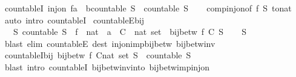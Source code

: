 \begin{isabellebody}
\endisatagproof
{\isafoldproof}%
%
\isadelimproof
\isanewline
%
\endisadelimproof
\isanewline
{}\isamarkupfalse%
\ countableI{\isacharprime}{\isacharcolon}\ {\isachardoublequoteopen}inj{\isacharunderscore}on\ {\isacharparenleft}f{\isacharcolon}{\isacharcolon}{\isacharprime}a\ {\isasymRightarrow}\ {\isacharprime}b{\isacharcolon}{\isacharcolon}countable{\isacharparenright}\ S\ {\isasymLongrightarrow}\ countable\ S{\isachardoublequoteclose}\isanewline
%
\isadelimproof
\ \ %
\endisadelimproof
%
\isatagproof
{}\isamarkupfalse%
\ comp{\isacharunderscore}inj{\isacharunderscore}on{\isacharbrackleft}of\ f\ S\ to{\isacharunderscore}nat{\isacharbrackright}\ \isamarkupfalse%
\ {\isacharparenleft}auto\ intro{\isacharcolon}\ countableI{\isacharparenright}%
\endisatagproof
{\isafoldproof}%
%
\isadelimproof
\isanewline
%
\endisadelimproof
\isanewline
{}\isamarkupfalse%
\ countableE{\isacharunderscore}bij{\isacharcolon}\isanewline
\ \ \ S{\isacharcolon}\ {\isachardoublequoteopen}countable\ S{\isachardoublequoteclose}\ \ f\ {\isacharcolon}{\isacharcolon}\ {\isachardoublequoteopen}nat\ {\isasymRightarrow}\ {\isacharprime}a{\isachardoublequoteclose}\ \ C\ {\isacharcolon}{\isacharcolon}\ {\isachardoublequoteopen}nat\ set{\isachardoublequoteclose}\ \ {\isachardoublequoteopen}bij{\isacharunderscore}betw\ f\ C\ S{\isachardoublequoteclose}\isanewline
%
\isadelimproof
\ \ %
\endisadelimproof
%
\isatagproof
{}\isamarkupfalse%
\ S\ \isamarkupfalse%
\ {\isacharparenleft}blast\ elim{\isacharcolon}\ countableE\ dest{\isacharcolon}\ inj{\isacharunderscore}on{\isacharunderscore}imp{\isacharunderscore}bij{\isacharunderscore}betw\ bij{\isacharunderscore}betw{\isacharunderscore}inv{\isacharparenright}%
\endisatagproof
{\isafoldproof}%
%
\isadelimproof
\isanewline
%
\endisadelimproof
\isanewline
{}\isamarkupfalse%
\ countableI{\isacharunderscore}bij{\isacharcolon}\ {\isachardoublequoteopen}bij{\isacharunderscore}betw\ f\ {\isacharparenleft}C{\isacharcolon}{\isacharcolon}nat\ set{\isacharparenright}\ S\ {\isasymLongrightarrow}\ countable\ S{\isachardoublequoteclose}\isanewline
%
\isadelimproof
\ \ %
\endisadelimproof
%
\isatagproof
{}\isamarkupfalse%
\ {\isacharparenleft}blast\ intro{\isacharcolon}\ countableI\ bij{\isacharunderscore}betw{\isacharunderscore}inv{\isacharunderscore}into\ bij{\isacharunderscore}betw{\isacharunderscore}imp{\isacharunderscore}inj{\isacharunderscore}on{\isacharparenright}%

\end{isabellebody}
